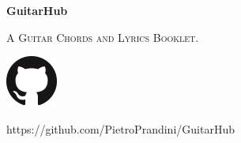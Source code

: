 
\begin{titlepage}
	\centering
	{\sffamily\huge\bfseries GuitarHub\par}
	{\ttfamily\scshape\Large A Guitar Chords and Lyrics Booklet.\par}
	\includegraphics[scale=0.3]{img/GitHub-Mark-64px}\par %
	{\ttfamily\footnotesize https://github.com/PietroPrandini/GuitarHub\par}
\end{titlepage}
